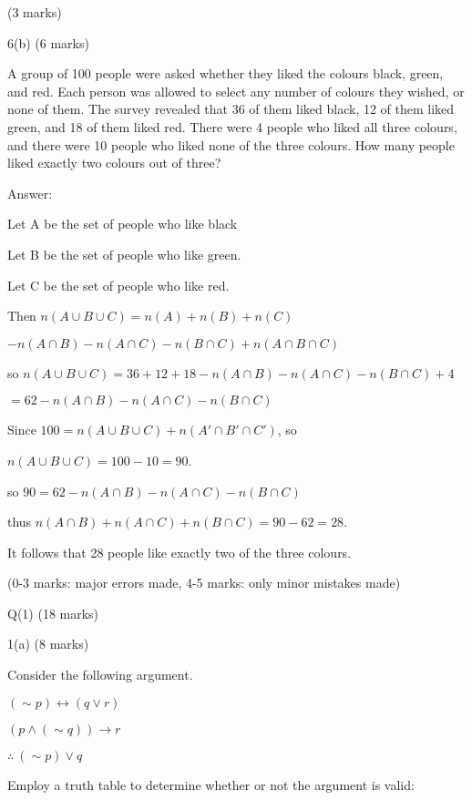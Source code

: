 \documentclass[a4paper,12pt,oneside]{book}
\theoremstyle{definition}
\begin{document}
(3 marks)

6(b) (6 marks)

A group of 100 people were asked whether they liked the colours black, green, and red. Each person was allowed to select any number of colours they wished, or none of them. The survey revealed that 36 of them liked black, 12 of them liked green, and 18 of them liked red. There were 4 people who liked all three colours, and there were 10 people who liked none of the three colours. How many people liked exactly two colours out of three?

Answer:

Let A be the set of people who like black

Let B be the set of people who like green.

Let C be the set of people who like red.

Then $n(A \cup B \cup C) = n(A)+n(B)+n(C)$

$-n(A \cap B)-n(A \cap C)-n(B \cap C)+n(A \cap B \cap C)$

so $n(A \cup B \cup C) = 36+12+18-n(A \cap B)-n(A \cap C)-n(B \cap C)+4$

$= 62-n(A \cap B)-n(A \cap C)-n(B \cap C)$

Since $100 = n(A \cup B \cup C)+n(A' \cap B' \cap C')$, so

$n(A \cup B \cup C) = 100-10 = 90$.

so $90=62-n(A \cap B)-n(A \cap C)-n(B \cap C)$

thus $n(A \cap B)+n(A \cap C)+n(B \cap C)=90-62=28$.

It follows that 28 people like exactly two of the three colours.

(0-3 marks: major errors made, 4-5 marks: only minor mistakes made)











\newpage

Q(1) (18 marks)

1(a) (8 marks)

Consider the following argument.

$(\sim p) \leftrightarrow (q \vee r)$

$(p \wedge (\sim q)) \rightarrow r$

$\therefore \ (\sim p) \vee q$

Employ a truth table to determine whether or not the argument is valid:
\end{document}

